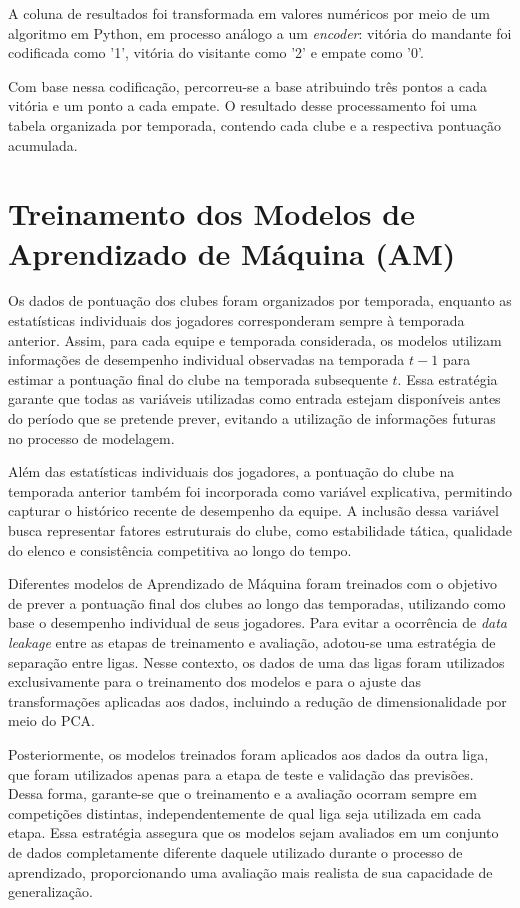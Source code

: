 A coluna de resultados foi transformada em valores numéricos por meio de um algoritmo em Python, em processo análogo a um \textit{encoder}: 
vitória do mandante foi codificada como '1', vitória do visitante como '2' e empate como '0'.

Com base nessa codificação, percorreu-se a base atribuindo três pontos a cada vitória e um ponto a cada empate. 
O resultado desse processamento foi uma tabela organizada por temporada, contendo cada clube e a respectiva pontuação acumulada.

\section{Treinamento dos Modelos de Aprendizado de Máquina (AM)}

Os dados de pontuação dos clubes foram organizados por temporada, enquanto as estatísticas individuais dos jogadores corresponderam sempre à temporada anterior. 
Assim, para cada equipe e temporada considerada, os modelos utilizam informações de desempenho individual observadas na temporada $t-1$ para estimar a pontuação 
final do clube na temporada subsequente $t$. Essa estratégia garante que todas as variáveis utilizadas como entrada estejam disponíveis antes do período que se 
pretende prever, evitando a utilização de informações futuras no processo de modelagem.

Além das estatísticas individuais dos jogadores, a pontuação do clube na temporada anterior também foi incorporada como variável explicativa, permitindo capturar 
o histórico recente de desempenho da equipe. A inclusão dessa variável busca representar fatores estruturais do clube, como estabilidade tática, qualidade do elenco 
e consistência competitiva ao longo do tempo.

Diferentes modelos de Aprendizado de Máquina foram treinados com o objetivo de prever a pontuação final dos clubes ao longo das temporadas, utilizando como base o 
desempenho individual de seus jogadores. Para evitar a ocorrência de \textit{data leakage} entre as etapas de treinamento e avaliação, adotou-se uma estratégia de 
separação entre ligas. Nesse contexto, os dados de uma das ligas foram utilizados exclusivamente para o treinamento dos modelos e para o ajuste das transformações 
aplicadas aos dados, incluindo a redução de dimensionalidade por meio do PCA.

Posteriormente, os modelos treinados foram aplicados aos dados da outra liga, que foram utilizados apenas para a etapa de teste e validação das previsões. Dessa forma, 
garante-se que o treinamento e a avaliação ocorram sempre em competições distintas, independentemente de qual liga seja utilizada em cada etapa. Essa estratégia 
assegura que os modelos sejam avaliados em um conjunto de dados completamente diferente daquele utilizado durante o processo de aprendizado, proporcionando uma 
avaliação mais realista de sua capacidade de generalização.

